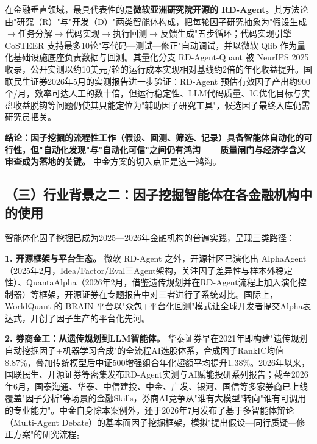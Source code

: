 \documentclass[UTF8,a4paper,zihao=-4,fontset=fandol]{ctexart}
\begin{document}
在金融垂直领域，最具代表性的是\textbf{微软亚洲研究院开源的 RD-Agent}。其方法论由"研究（R）"与"开发（D）"两类智能体构成，把每轮因子研究抽象为"假设生成\ensuremath{\rightarrow}任务分解\ensuremath{\rightarrow}代码实现\ensuremath{\rightarrow}执行回测\ensuremath{\rightarrow}反馈生成"五步循环；代码实现引擎 CoSTEER 支持最多10轮"写代码—测试—修正"自动调试，并以微软 Qlib 作为量化基础设施底座负责数据与回测\cite{microsoft-rd-agent}。其量化分支 RD-Agent-Quant 被 NeurIPS 2025 收录，公开实测以约10美元/轮的运行成本实现相对基线约2倍的年化收益提升\cite{microsoft-rd-agent}。国联民生证券2026年5月的实测报告进一步验证：RD-Agent 预估有效因子产出约900个/月，效率可达人工的数十倍，但运行稳定性、LLM代码质量、IC优化目标与实盘收益脱钩等问题仍使其只能定位为"辅助因子研究工具"，候选因子最终入库仍需研究员把关\cite{glms-rd-agent}。

\textbf{结论：因子挖掘的流程性工作（假设、回测、筛选、记录）具备智能体自动化的可行性，但"自动化发现"与"自动化可信"之间仍有鸿沟——质量闸门与经济学含义审查成为落地的关键。} 中金方案的切入点正是这一鸿沟\cite{cicc-loop-2026}。

\subsection{（三）行业背景之二：因子挖掘智能体在各金融机构中的使用}
智能体化因子挖掘已成为2025—2026年金融机构的普遍实践，呈现三类路径：

\textbf{1. 开源框架与平台生态。} 微软 RD-Agent 之外，开源社区已演化出 AlphaAgent（2025年2月，Idea/Factor/Eval三Agent架构，关注因子差异性与样本外稳定性）、QuantaAlpha（2026年2月，借鉴遗传规划并在RD-Agent流程上加入演化控制器）等框架，开源证券在专题报告中对三者进行了系统对比\cite{ky-factor-mining}。国际上，WorldQuant 的 BRAIN 平台以"众包+平台化回测"模式让全球开发者提交Alpha表达式，开创了因子生产的平台化先河\cite{worldquant-brain}。

\textbf{2. 券商金工：从遗传规划到LLM智能体。} 华泰证券早在2021年即构建"遗传规划自动挖掘因子+机器学习合成"的全流程AI选股体系，合成因子RankIC均值8.87\%，叠加传统模型后中证500增强组合年化超额平均提升1.38\%\cite{ht-ai-stock-selection}。2026年以来，国联民生、开源证券等密集发布RD-Agent实测与AI赋能投研系列报告\cite{glms-rd-agent}\cite{ky-factor-mining}；截至2026年6月，国泰海通、华泰、中信建投、中金、广发、银河、国信等多家券商已上线覆盖"因子分析"等场景的金融Skills，券商AI竞争从"谁有大模型"转向"谁有可调用的专业能力"\cite{cls-financial-skills}。中金自身除本案例外，还于2026年7月发布了基于多智能体辩论（Multi-Agent Debate）的基本面因子挖掘框架，模拟"提出假设—同行质疑—修正方案"的研究流程\cite{cicc-multi-agent}。
\end{document}
